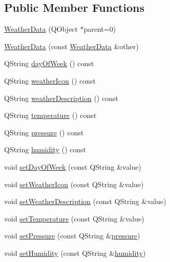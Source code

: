 \subsection*{Public Member Functions}
\begin{DoxyCompactItemize}
\item 
\hyperlink{class_weather_data_aae42655299392d3f90feec9911a2dd60}{Weather\+Data} (Q\+Object $\ast$parent=0)
\item 
\hyperlink{class_weather_data_a48baeaa6b2a77d2a5e008159188416e8}{Weather\+Data} (const \hyperlink{class_weather_data}{Weather\+Data} \&other)
\item 
Q\+String \hyperlink{class_weather_data_a413b0ccf3fad036782ee5f5cb66f9a62}{day\+Of\+Week} () const
\item 
Q\+String \hyperlink{class_weather_data_a5baf2d9cc08741d7af4a07d61df95ee4}{weather\+Icon} () const
\item 
Q\+String \hyperlink{class_weather_data_a63a3528697c8681bd32d4d170ec91f76}{weather\+Description} () const
\item 
Q\+String \hyperlink{class_weather_data_a5a193e8410e3a146de59bab224cd88f0}{temperature} () const
\item 
Q\+String \hyperlink{class_weather_data_af726e713890bd6d310fe4a718dd69c77}{pressure} () const
\item 
Q\+String \hyperlink{class_weather_data_a0a83b2ee5398eaba062e3c6fe9264a3d}{humidity} () const
\item 
void \hyperlink{class_weather_data_ab47f3e7cde6cf4d93dfb1750ac014f00}{set\+Day\+Of\+Week} (const Q\+String \&value)
\item 
void \hyperlink{class_weather_data_a2a8093aaf20e1fb3c63c429a4ae0a977}{set\+Weather\+Icon} (const Q\+String \&value)
\item 
void \hyperlink{class_weather_data_a68686722f2e0bbf5cb28f0fdc96e280d}{set\+Weather\+Description} (const Q\+String \&value)
\item 
void \hyperlink{class_weather_data_afee514cbb8713059cf8d0602b33cadf5}{set\+Temperature} (const Q\+String \&value)
\item 
void \hyperlink{class_weather_data_ad5b453016656864e2bc3a09fc75919a0}{set\+Pressure} (const Q\+String \&\hyperlink{class_weather_data_af726e713890bd6d310fe4a718dd69c77}{pressure})
\item 
void \hyperlink{class_weather_data_aad895695b5f0651c58657973f2140509}{set\+Humidity} (const Q\+String \&\hyperlink{class_weather_data_a0a83b2ee5398eaba062e3c6fe9264a3d}{humidity})
\end{DoxyCompactItemize}
